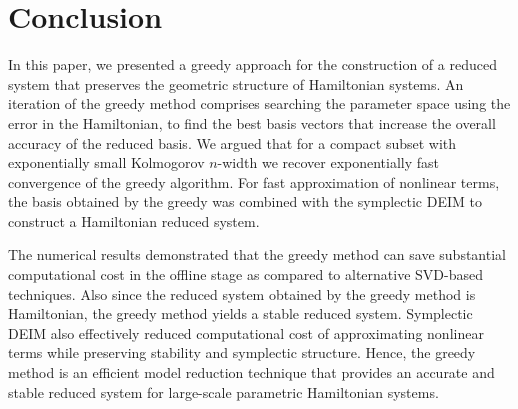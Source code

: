 \section{Conclusion} \label{chap:Con:1}

In this paper, we {\edit presented} a greedy approach for the construction of a reduced system that preserves the geometric structure of Hamiltonian systems. An iteration of the greedy method comprises searching the parameter space using the error in the Hamiltonian, to find the best basis vectors that increase the overall accuracy of the reduced basis. We argued that for a compact subset with exponentially small Kolmogorov $n$-width we recover exponentially fast convergence of the greedy algorithm. For fast approximation of nonlinear terms, the basis obtained by the greedy was combined with the symplectic DEIM to construct a Hamiltonian reduced system.




The numerical results demonstrated that the greedy method can save substantial computational cost in the offline stage as compared to alternative SVD-based techniques. Also since the reduced system obtained by the greedy method is Hamiltonian, the greedy method yields a stable reduced system. Symplectic DEIM also effectively reduced computational cost of approximating nonlinear terms while preserving stability and symplectic structure. Hence, the greedy method is an efficient model reduction technique that provides an accurate and stable reduced system for large-scale parametric Hamiltonian systems.


